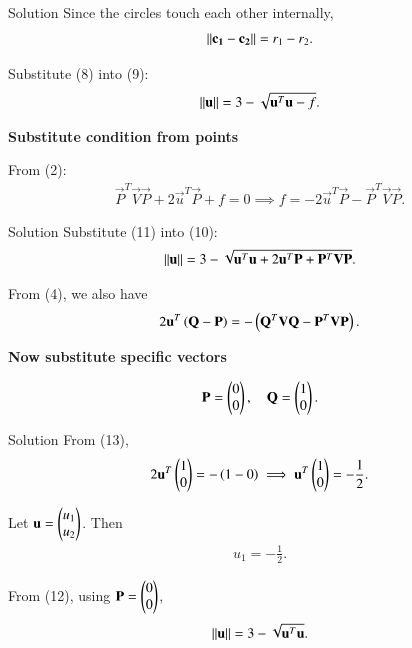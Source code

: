 \documentclass{beamer}
\begin{document}
\begin{frame}{Solution}
    Since the circles touch each other internally,
\begin{align}
\left\lVert\mathbf{c_1} - \mathbf{c_2}\right\rVert = r_1 - r_2. \label{eq:tangent}
\end{align}

Substitute (8) into (9):
\begin{align}
\left\lVert\mathbf{u}\right\rVert = 3 - \sqrt{\mathbf{u}^{T}\mathbf{u} - f}. \label{eq:relation}
\end{align}

\textbf{Substitute condition from points}

From (2):
\begin{align}
\vec{P}^{T}\vec{V}\vec{P} + 2\vec{u}^{T}\vec{P} + f = 0 \implies f = -2\vec{u}^{T}\vec{P} - \vec{P}^{T}\vec{V}\vec{P}. \label{eq:f}
\end{align}
\end{frame}

\begin{frame}{Solution}
    Substitute (11) into (10):
\begin{align}
\left\lVert\mathbf{u}\right\rVert = 3 - \sqrt{\mathbf{u}^{T}\mathbf{u} + 2\mathbf{u}^{T}\mathbf{P} + \mathbf{P}^{T}\mathbf{V}\mathbf{P}}.
\label{eq:u_equation}
\end{align}

From (4), we also have
\begin{align}
2\mathbf{u}^{T}\left(\mathbf{Q} - \mathbf{P}\right) = -\left(\mathbf{Q}^{T}\mathbf{V}\mathbf{Q} - \mathbf{P}^{T}\mathbf{V}\mathbf{P}\right).
\label{eq:u_cond}
\end{align}

\textbf{Now substitute specific vectors}

\begin{align}
\mathbf{P} = \begin{pmatrix}0\\0\end{pmatrix}, \quad \mathbf{Q} = \begin{pmatrix}1\\0\end{pmatrix}.
\end{align}
\end{frame}

\begin{frame}{Solution}
    From (13),
\begin{align}
2\mathbf{u}^{T}\begin{pmatrix}1\\0\end{pmatrix} = -\left(1 - 0\right) \implies \mathbf{u}^{T}\begin{pmatrix}1\\0\end{pmatrix} = -\frac{1}{2}.
\end{align}

Let $\mathbf{u} = \begin{pmatrix}u_1\\u_2\end{pmatrix}$. Then
\begin{align}
u_1 = -\frac{1}{2}.
\end{align}

From (12), using $\mathbf{P} = \begin{pmatrix}0\\0\end{pmatrix}$,
\begin{align}
\left\lVert\mathbf{u}\right\rVert = 3 - \sqrt{\mathbf{u}^{T}\mathbf{u}}.
\end{align}
\end{frame}
\end{document}

